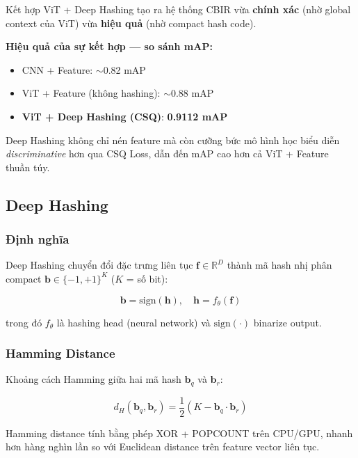\documentclass[13pt,a4paper]{article}
\newcommand{\R}{\mathbb{R}}
\begin{document}
Kết hợp ViT + Deep Hashing tạo ra hệ thống CBIR vừa \textbf{chính xác} (nhờ global context của ViT) vừa \textbf{hiệu quả} (nhờ compact hash code).

\textbf{Hiệu quả của sự kết hợp --- so sánh mAP:}
\begin{itemize}
    \item CNN + Feature: $\sim$0.82 mAP
    \item ViT + Feature (không hashing): $\sim$0.88 mAP
    \item \textbf{ViT + Deep Hashing (CSQ)}: \textbf{0.9112 mAP}
\end{itemize}

Deep Hashing không chỉ nén feature mà còn cưỡng bức mô hình học biểu diễn \textit{discriminative} hơn qua CSQ Loss, dẫn đến mAP cao hơn cả ViT + Feature thuần túy.


\subsection{Deep Hashing}

\subsubsection{Định nghĩa}

Deep Hashing chuyển đổi đặc trưng liên tục $\mathbf{f} \in \R^D$ thành mã hash nhị phân compact $\mathbf{b} \in \{-1, +1\}^K$ ($K$ = số bit):

\begin{equation}
\mathbf{b} = \text{sign}(\mathbf{h}), \quad \mathbf{h} = f_\theta(\mathbf{f})
\end{equation}

trong đó $f_\theta$ là hashing head (neural network) và $\text{sign}(\cdot)$ binarize output.

\subsubsection{Hamming Distance}

Khoảng cách Hamming giữa hai mã hash $\mathbf{b}_q$ và $\mathbf{b}_r$:

\begin{equation}
d_H(\mathbf{b}_q, \mathbf{b}_r) = \frac{1}{2}\left(K - \mathbf{b}_q \cdot \mathbf{b}_r\right)
\label{eq:hamming}
\end{equation}

Hamming distance tính bằng phép XOR + POPCOUNT trên CPU/GPU, nhanh hơn hàng nghìn lần so với Euclidean distance trên feature vector liên tục.
\end{document}
